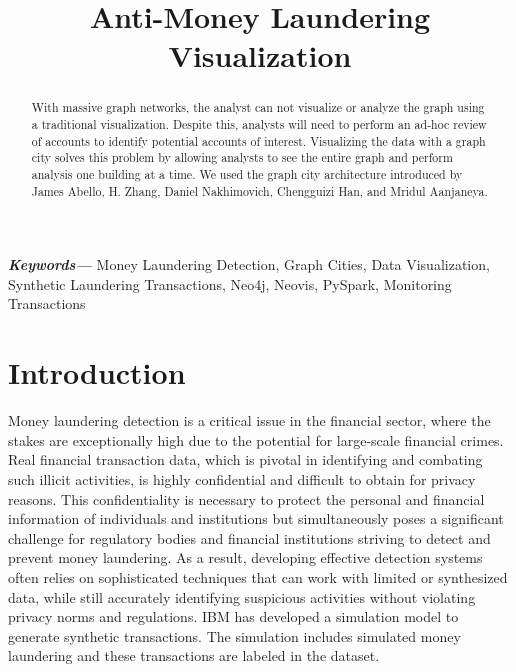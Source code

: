 \documentclass[10pt,conference]{IEEEtran}
\begin{document}
\title{Anti-Money Laundering Visualization}
\author{
\and
{}
\and
{}
}
\maketitle
\begin{abstract}
\textnormal{With massive graph networks, the analyst can not visualize or analyze the graph using a traditional visualization. Despite this, analysts will need to perform an ad-hoc review of accounts to identify potential accounts of interest. Visualizing the data with a graph city solves this problem by allowing analysts to see the entire graph and perform analysis one building at a time. We used the graph city architecture introduced by James Abello, H. Zhang, Daniel Nakhimovich, Chengguizi Han, and Mridul Aanjaneya.\cite{Abello2022GigaGC}}
\end{abstract}
\providecommand{\keywords}[1]
{
  \small	
  \textbf{\textit{Keywords---}} #1
}
\keywords{Money Laundering Detection, Graph Cities, Data Visualization, Synthetic Laundering Transactions, Neo4j, Neovis, PySpark, Monitoring Transactions
}

\IEEEpeerreviewmaketitle
\section{Introduction}\label{sec:1. Introduction}
\textnormal{
\setlength{\parindent}{2em}Money laundering detection is a critical issue in the financial sector, where the stakes are exceptionally high due to the potential for large-scale financial crimes. Real financial transaction data, which is pivotal in identifying and combating such illicit activities, is highly confidential and difficult to obtain for privacy reasons. This confidentiality is necessary to protect the personal and financial information of individuals and institutions but simultaneously poses a significant challenge for regulatory bodies and financial institutions striving to detect and prevent money laundering. As a result, developing effective detection systems often relies on sophisticated techniques that can work with limited or synthesized data, while still accurately identifying suspicious activities without violating privacy norms and regulations. IBM has developed a simulation model to generate synthetic transactions. The simulation includes simulated money laundering and these transactions are labeled in the dataset.
}
\end{document}
